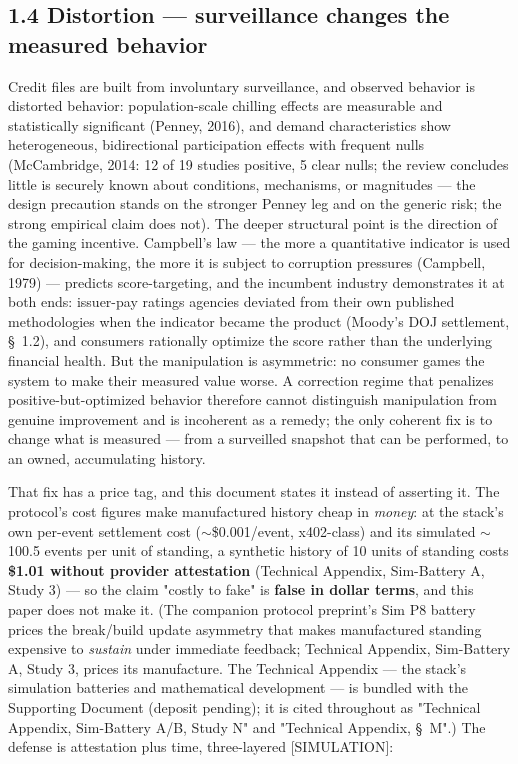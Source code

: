 \documentclass[11pt,twocolumn]{article}
\begin{document}
\subsection*{1.4 Distortion --- surveillance changes the measured behavior}

Credit files are built from involuntary surveillance, and observed behavior is distorted behavior: population-scale chilling effects are measurable and statistically significant (Penney, 2016), and demand characteristics show heterogeneous, bidirectional participation effects with frequent nulls (McCambridge, 2014: 12 of 19 studies positive, 5 clear nulls; the review concludes little is securely known about conditions, mechanisms, or magnitudes --- the design precaution stands on the stronger Penney leg and on the generic risk; the strong empirical claim does not). The deeper structural point is the direction of the gaming incentive. Campbell's law --- the more a quantitative indicator is used for decision-making, the more it is subject to corruption pressures (Campbell, 1979) --- predicts score-targeting, and the incumbent industry demonstrates it at both ends: issuer-pay ratings agencies deviated from their own published methodologies when the indicator became the product (Moody's DOJ settlement, \S~1.2), and consumers rationally optimize the score rather than the underlying financial health. But the manipulation is asymmetric: no consumer games the system to make their measured value worse. A correction regime that penalizes positive-but-optimized behavior therefore cannot distinguish manipulation from genuine improvement and is incoherent as a remedy; the only coherent fix is to change what is measured --- from a surveilled snapshot that can be performed, to an owned, accumulating history.

That fix has a price tag, and this document states it instead of asserting it. The protocol's cost figures make manufactured history cheap in \emph{money}: at the stack's own per-event settlement cost ($\sim$\$0.001/event, x402-class) and its simulated $\sim$100.5 events per unit of standing, a synthetic history of 10 units of standing costs \textbf{\$1.01 without provider attestation} (Technical Appendix, Sim-Battery A, Study 3) --- so the claim "costly to fake" is \textbf{false in dollar terms}, and this paper does not make it. (The companion protocol preprint's Sim P8 battery prices the break/build update asymmetry that makes manufactured standing expensive to \emph{sustain} under immediate feedback; Technical Appendix, Sim-Battery A, Study 3, prices its manufacture. The Technical Appendix --- the stack's simulation batteries and mathematical development --- is bundled with the Supporting Document (deposit pending); it is cited throughout as "Technical Appendix, Sim-Battery A/B, Study N" and "Technical Appendix, \S~M".) The defense is attestation plus time, three-layered [SIMULATION]:
\end{document}
